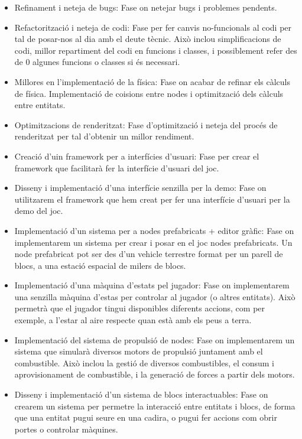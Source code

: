 \begin{itemize}
  \item{Refinament i neteja de bugs: }Fase on netejar bugs i problemes pendents.
  \item{Refactorització i neteja de codi: }Fase per fer canvis no-funcionals al codi per tal de posar-nos al dia amb el deute tècnic. Això inclou simplificacions de codi, millor repartiment del codi en funcions i classes, i possiblement refer des de 0 algunes funcions o classes si és necessari.
  \item{Millores en l'implementació de la física: }Fase on acabar de refinar els càlculs de física. Implementació de co\lgem isions entre nodes i optimització dels càlculs entre entitats.
  \item{Optimitzacions de renderitzat: }Fase d'optimització i neteja del procés de renderitzat per tal d'obtenir un millor rendiment.
  \item{Creació d'uin framework per a interfícies d'usuari: }Fase per crear el framework que facilitarà fer la interfície d'usuari del joc.
  \item{Disseny i implementació d'una interfície senzilla per la demo: }Fase on utilitzarem el framework que hem creat per fer una interfície d'usuari per la demo del joc.
  \item{Implementació d'un sistema per a nodes prefabricats + editor gràfic: }Fase on implementarem un sistema per crear i posar en el joc nodes prefabricats. Un node prefabricat pot ser des d'un vehicle terrestre format per un parell de blocs, a una estació espacial de milers de blocs.
  \item{Implementació d'una màquina d'estats pel jugador: }Fase on implementarem una senzilla màquina d'estas per controlar al jugador (o altres entitats). Això permetrà que el jugador tingui disponibles diferents accions, com per exemple, a l'estar al aire respecte quan està amb els peus a terra.
  \item{Implementació del sistema de propulsió de nodes: }Fase on implementarem un sistema que simularà diversos motors de propulsió juntament amb el combustible. Això inclou la gestió de diversos combustibles, el consum i aprovisionament de combustible, i la generació de forces a partir dels motors.
  \item{Disseny i implementació d'un sistema de blocs interactuables: }Fase on crearem un sistema per permetre la interacció entre entitats i blocs, de forma que una entitat pugui seure en una cadira, o pugui fer accions com obrir portes o controlar màquines.

\end{itemize}

